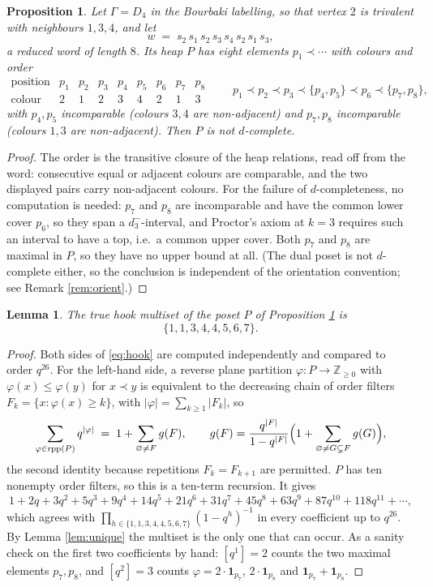 \documentclass[reqno]{amsart}
\theoremstyle{plain}
\newtheorem{proposition}[theorem]{Proposition}
\newtheorem{lemma}[theorem]{Lemma}
\theoremstyle{definition}
\DeclareMathOperator{\rpp}{rpp}
\begin{document}
\begin{proposition}\label{prop:witness}
Let $\Gamma=D_4$ in the Bourbaki labelling, so that vertex $2$ is trivalent
with neighbours $1,3,4$, and let
\[
   w \;=\; s_2\,s_1\,s_2\,s_3\,s_4\,s_2\,s_1\,s_3 ,
\]
a reduced word of length $8$.  Its heap $P$ has eight elements
$p_1\prec\cdots$ with colours and order
\[
  \begin{array}{c|cccccccc}
    \text{position} & p_1&p_2&p_3&p_4&p_5&p_6&p_7&p_8\\\hline
    \text{colour}   & 2 & 1 & 2 & 3 & 4 & 2 & 1 & 3
  \end{array}
  \qquad
  p_1\prec p_2\prec p_3\prec\{p_4,p_5\}\prec p_6\prec\{p_7,p_8\},
\]
with $p_4,p_5$ incomparable \textup{(}colours $3,4$ are non-adjacent\textup{)}
and $p_7,p_8$ incomparable \textup{(}colours $1,3$ are
non-adjacent\textup{)}.  Then $P$ is not $d$-complete.
\end{proposition}

\begin{proof}
The order is the transitive closure of the heap relations, read off from the
word: consecutive equal or adjacent colours are comparable, and the two
displayed pairs carry non-adjacent colours.  For the failure of
$d$-completeness, no computation is needed: $p_7$ and $p_8$ are incomparable
and have the common lower cover $p_6$, so they span a $d_3^-$-interval, and
Proctor's axiom at $k=3$ requires such an interval to have a top, i.e.\ a
common upper cover.  Both $p_7$ and $p_8$ are maximal in $P$, so they have no
upper bound at all.  (The dual poset is not $d$-complete either, so the
conclusion is independent of the orientation convention; see Remark
\ref{rem:orient}.)
\end{proof}

\begin{lemma}\label{lem:true}
The true hook multiset of the poset $P$ of Proposition \ref{prop:witness} is
\[
   \{1,1,3,4,4,5,6,7\}.
\]
\end{lemma}

\begin{proof}
Both sides of \eqref{eq:hook} are computed independently and compared to order
$q^{26}$.  For the left-hand side, a reverse plane partition
$\varphi:P\to\mathbb{Z}_{\ge0}$ with $\varphi(x)\le\varphi(y)$ for
$x\prec y$ is equivalent to the decreasing chain of order filters
$F_k=\{x:\varphi(x)\ge k\}$, with $|\varphi|=\sum_{k\ge1}|F_k|$, so
\[
  \sum_{\varphi\in\rpp(P)}q^{|\varphi|}
  \;=\;1+\sum_{\varnothing\ne F}g(F),
  \qquad
  g(F)=\frac{q^{|F|}}{1-q^{|F|}}\Bigl(1+\sum_{\varnothing\ne G\subsetneq F}g(G)\Bigr),
\]
the second identity because repetitions $F_k=F_{k+1}$ are permitted.  $P$ has
ten nonempty order filters, so this is a ten-term recursion.  It gives
\[
  1+2q+3q^2+5q^3+9q^4+14q^5+21q^6+31q^7+45q^8+63q^9+87q^{10}+118q^{11}+\cdots,
\]
which agrees with $\prod_{h\in\{1,1,3,4,4,5,6,7\}}(1-q^h)^{-1}$ in every
coefficient up to $q^{26}$.  By Lemma \ref{lem:unique} the multiset is the
only one that can occur.  As a sanity check on the first two coefficients by
hand: $[q^1]=2$ counts the two maximal elements $p_7,p_8$, and $[q^2]=3$
counts $\varphi=2\cdot\mathbf 1_{p_7}$, $2\cdot\mathbf 1_{p_8}$ and
$\mathbf 1_{p_7}+\mathbf 1_{p_8}$.
\end{proof}
\end{document}
